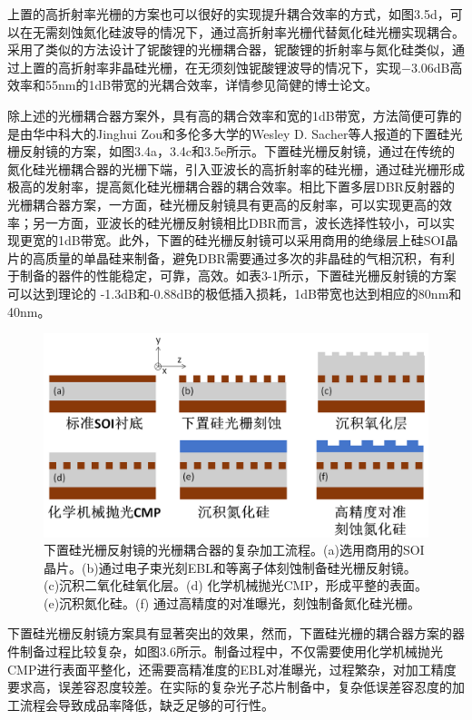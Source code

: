 上置的高折射率光栅的方案也可以很好的实现提升耦合效率的方式，如图3.5d，可以在无需刻蚀氮化硅波导的情况下，通过高折射率光栅代替氮化硅光栅实现耦合。采用了类似的方法设计了铌酸锂的光栅耦合器，铌酸锂的折射率与氮化硅类似，通过上置的高折射率非晶硅光栅，在无须刻蚀铌酸锂波导的情况下，实现$-$3.06dB高效率和55nm的1dB带宽的光耦合效率，详情参见简健的博士论文。

除上述的光栅耦合器方案外，具有高的耦合效率和宽的1dB带宽，方法简便可靠的是由华中科大的Jinghui Zou和多伦多大学的Wesley D. Sacher等人报道的下置硅光栅反射镜的方案，如图3.4a，3.4c和3.5e所示\cite{Sacher2014Wide,Jinghui2015Ultra}。下置硅光栅反射镜，通过在传统的氮化硅光栅耦合器的光栅下端，引入亚波长的高折射率的硅光栅，通过硅光栅形成极高的发射率，提高氮化硅光栅耦合器的耦合效率。相比下置多层DBR反射器的光栅耦合器方案，一方面，硅光栅反射镜具有更高的反射率，可以实现更高的效率；另一方面，亚波长的硅光栅反射镜相比DBR而言，波长选择性较小，可以实现更宽的1dB带宽。此外，下置的硅光栅反射镜可以采用商用的绝缘层上硅SOI晶片的高质量的单晶硅来制备，避免DBR需要通过多次的非晶硅的气相沉积，有利于制备的器件的性能稳定，可靠，高效。如表3-1所示，下置硅光栅反射镜的方案可以达到理论的 -1.3dB和-0.88dB的极低插入损耗，1dB带宽也达到相应的80nm和40nm。

\begin{figure}[!htbp]
    \centering
    \includegraphics[width=1\textwidth]{Img/3-6.png}
    \caption{下置硅光栅反射镜的光栅耦合器的复杂加工流程。(a)选用商用的SOI晶片。(b)通过电子束光刻EBL和等离子体刻蚀制备硅光栅反射镜。(c)沉积二氧化硅氧化层。(d) 化学机械抛光CMP，形成平整的表面。(e)沉积氮化硅。(f) 通过高精度的对准曝光，刻蚀制备氮化硅光栅。}
    \label{fig:3-6}
\end{figure}

下置硅光栅反射镜方案具有显著突出的效果，然而，下置硅光栅的耦合器方案的器件制备过程比较复杂，如图3.6所示。制备过程中，不仅需要使用化学机械抛光CMP进行表面平整化，还需要高精准度的EBL对准曝光，过程繁杂，对加工精度要求高，误差容忍度较差。在实际的复杂光子芯片制备中，复杂低误差容忍度的加工流程会导致成品率降低，缺乏足够的可行性。\cite{Hochberg2010Towards}

